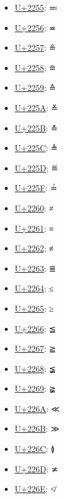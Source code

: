 \begin{itemize}
	\item \href{https://www.compart.com/en/unicode/U+2255}{U+2255}: ≕
	\item \href{https://www.compart.com/en/unicode/U+2256}{U+2256}: ≖
	\item \href{https://www.compart.com/en/unicode/U+2257}{U+2257}: ≗
	\item \href{https://www.compart.com/en/unicode/U+2258}{U+2258}: ≘
	\item \href{https://www.compart.com/en/unicode/U+2259}{U+2259}: ≙
	\item \href{https://www.compart.com/en/unicode/U+225A}{U+225A}: ≚
	\item \href{https://www.compart.com/en/unicode/U+225B}{U+225B}: ≛
	\item \href{https://www.compart.com/en/unicode/U+225C}{U+225C}: ≜
	\item \href{https://www.compart.com/en/unicode/U+225D}{U+225D}: ≝
	\item \href{https://www.compart.com/en/unicode/U+225F}{U+225F}: ≟
	\item \href{https://www.compart.com/en/unicode/U+2260}{U+2260}: ≠
	\item \href{https://www.compart.com/en/unicode/U+2261}{U+2261}: ≡
	\item \href{https://www.compart.com/en/unicode/U+2262}{U+2262}: ≢
	\item \href{https://www.compart.com/en/unicode/U+2263}{U+2263}: ≣
	\item \href{https://www.compart.com/en/unicode/U+2264}{U+2264}: ≤
	\item \href{https://www.compart.com/en/unicode/U+2265}{U+2265}: ≥
	\item \href{https://www.compart.com/en/unicode/U+2266}{U+2266}: ≦
	\item \href{https://www.compart.com/en/unicode/U+2267}{U+2267}: ≧
	\item \href{https://www.compart.com/en/unicode/U+2268}{U+2268}: ≨
	\item \href{https://www.compart.com/en/unicode/U+2269}{U+2269}: ≩
	\item \href{https://www.compart.com/en/unicode/U+226A}{U+226A}: ≪
	\item \href{https://www.compart.com/en/unicode/U+226B}{U+226B}: ≫
	\item \href{https://www.compart.com/en/unicode/U+226C}{U+226C}: ≬
	\item \href{https://www.compart.com/en/unicode/U+226D}{U+226D}: ≭
	\item \href{https://www.compart.com/en/unicode/U+226E}{U+226E}: ≮

\end{itemize}
